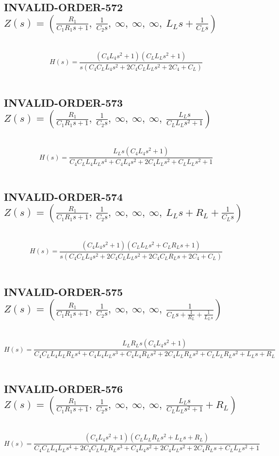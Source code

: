 \documentclass{article}
\begin{document}
\subsection{INVALID-ORDER-572 $Z(s) = \left( \frac{R_{1}}{C_{1} R_{1} s + 1}, \  \frac{1}{C_{2} s}, \  \infty, \  \infty, \  \infty, \  L_{L} s + \frac{1}{C_{L} s}\right)$ } \ 
\textbf{\[H(s) = \frac{\left(C_{4} L_{4} s^{2} + 1\right) \left(C_{L} L_{L} s^{2} + 1\right)}{s \left(C_{4} C_{L} L_{4} s^{2} + 2 C_{4} C_{L} L_{L} s^{2} + 2 C_{4} + C_{L}\right)}\] } \ 
\subsection{INVALID-ORDER-573 $Z(s) = \left( \frac{R_{1}}{C_{1} R_{1} s + 1}, \  \frac{1}{C_{2} s}, \  \infty, \  \infty, \  \infty, \  \frac{L_{L} s}{C_{L} L_{L} s^{2} + 1}\right)$ } \ 
\textbf{\[H(s) = \frac{L_{L} s \left(C_{4} L_{4} s^{2} + 1\right)}{C_{4} C_{L} L_{4} L_{L} s^{4} + C_{4} L_{4} s^{2} + 2 C_{4} L_{L} s^{2} + C_{L} L_{L} s^{2} + 1}\] } \ 
\subsection{INVALID-ORDER-574 $Z(s) = \left( \frac{R_{1}}{C_{1} R_{1} s + 1}, \  \frac{1}{C_{2} s}, \  \infty, \  \infty, \  \infty, \  L_{L} s + R_{L} + \frac{1}{C_{L} s}\right)$ } \ 
\textbf{\[H(s) = \frac{\left(C_{4} L_{4} s^{2} + 1\right) \left(C_{L} L_{L} s^{2} + C_{L} R_{L} s + 1\right)}{s \left(C_{4} C_{L} L_{4} s^{2} + 2 C_{4} C_{L} L_{L} s^{2} + 2 C_{4} C_{L} R_{L} s + 2 C_{4} + C_{L}\right)}\] } \ 
\subsection{INVALID-ORDER-575 $Z(s) = \left( \frac{R_{1}}{C_{1} R_{1} s + 1}, \  \frac{1}{C_{2} s}, \  \infty, \  \infty, \  \infty, \  \frac{1}{C_{L} s + \frac{1}{R_{L}} + \frac{1}{L_{L} s}}\right)$ } \ 
\textbf{\[H(s) = \frac{L_{L} R_{L} s \left(C_{4} L_{4} s^{2} + 1\right)}{C_{4} C_{L} L_{4} L_{L} R_{L} s^{4} + C_{4} L_{4} L_{L} s^{3} + C_{4} L_{4} R_{L} s^{2} + 2 C_{4} L_{L} R_{L} s^{2} + C_{L} L_{L} R_{L} s^{2} + L_{L} s + R_{L}}\] } \ 
\subsection{INVALID-ORDER-576 $Z(s) = \left( \frac{R_{1}}{C_{1} R_{1} s + 1}, \  \frac{1}{C_{2} s}, \  \infty, \  \infty, \  \infty, \  \frac{L_{L} s}{C_{L} L_{L} s^{2} + 1} + R_{L}\right)$ } \ 
\textbf{\[H(s) = \frac{\left(C_{4} L_{4} s^{2} + 1\right) \left(C_{L} L_{L} R_{L} s^{2} + L_{L} s + R_{L}\right)}{C_{4} C_{L} L_{4} L_{L} s^{4} + 2 C_{4} C_{L} L_{L} R_{L} s^{3} + C_{4} L_{4} s^{2} + 2 C_{4} L_{L} s^{2} + 2 C_{4} R_{L} s + C_{L} L_{L} s^{2} + 1}\] } \ 
\end{document}
